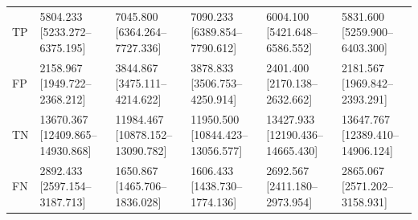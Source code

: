 \begin{tabular}{llllll}
TP & 5804.233 [5233.272--6375.195] & 7045.800 [6364.264--7727.336] & 7090.233 [6389.854--7790.612] & 6004.100 [5421.648--6586.552] & 5831.600 [5259.900--6403.300] \\
FP & 2158.967 [1949.722--2368.212] & 3844.867 [3475.111--4214.622] & 3878.833 [3506.753--4250.914] & 2401.400 [2170.138--2632.662] & 2181.567 [1969.842--2393.291] \\
TN & 13670.367 [12409.865--14930.868] & 11984.467 [10878.152--13090.782] & 11950.500 [10844.423--13056.577] & 13427.933 [12190.436--14665.430] & 13647.767 [12389.410--14906.124] \\
FN & 2892.433 [2597.154--3187.713] & 1650.867 [1465.706--1836.028] & 1606.433 [1438.730--1774.136] & 2692.567 [2411.180--2973.954] & 2865.067 [2571.202--3158.931] \\
\bottomrule
\end{tabular}
